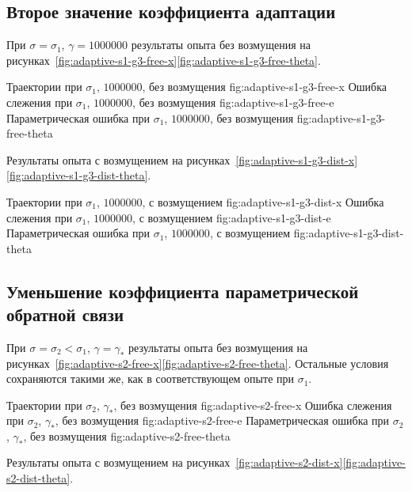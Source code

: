 \subsection{Второе значение коэффициента адаптации}

При $\sigma=\sigma_1$, $\gamma=1000000$ результаты опыта без возмущения
 на рисунках~\mbox{\ref{fig:adaptive-s1-g3-free-x}\textendash\ref{fig:adaptive-s1-g3-free-theta}}.

  {Траектории при $\sigma_1$, $1000000$, без возмущения}
  {fig:adaptive-s1-g3-free-x}
  {Ошибка слежения при $\sigma_1$, $1000000$, без возмущения}
  {fig:adaptive-s1-g3-free-e}
  {Параметрическая ошибка при $\sigma_1$, $1000000$, без возмущения}
  {fig:adaptive-s1-g3-free-theta}

Результаты опыта с возмущением
на рисунках~\mbox{\ref{fig:adaptive-s1-g3-dist-x}\textendash\ref{fig:adaptive-s1-g3-dist-theta}}.

  {Траектории при $\sigma_1$, $1000000$, с возмущением}
  {fig:adaptive-s1-g3-dist-x}
  {Ошибка слежения при $\sigma_1$, $1000000$, с возмущением}
  {fig:adaptive-s1-g3-dist-e}
  {Параметрическая ошибка при $\sigma_1$, $1000000$, с возмущением}
  {fig:adaptive-s1-g3-dist-theta}

\subsection{Уменьшение коэффициента параметрической обратной связи}

При $\sigma=\sigma_2<\sigma_1$, $\gamma=\gamma_*$ результаты опыта
без возмущения
на рисунках~\mbox{\ref{fig:adaptive-s2-free-x}\textendash\ref{fig:adaptive-s2-free-theta}}.
Остальные условия сохраняются такими же, как в соответствующем опыте
при $\sigma_1$.

  {Траектории при $\sigma_2$, $\gamma_*$, без возмущения}
  {fig:adaptive-s2-free-x}
  {Ошибка слежения при $\sigma_2$, $\gamma_*$, без возмущения}
  {fig:adaptive-s2-free-e}
  {Параметрическая ошибка при $\sigma_2$, $\gamma_*$, без возмущения}
  {fig:adaptive-s2-free-theta}

Результаты опыта с возмущением
на рисунках~\mbox{\ref{fig:adaptive-s2-dist-x}\textendash\ref{fig:adaptive-s2-dist-theta}}.

